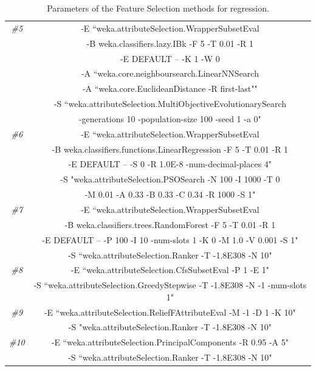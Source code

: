 \documentclass[journal,twoside,web]{ieeecolor}
\begin{document}
\begin{table}[h!]
\begin{center}
{\begin{tabular}{cc}
			
			\textit{\#5} &  -E 
			 ``weka.attributeSelection.WrapperSubsetEval \\
			& -B weka.classifiers.lazy.IBk -F 5 -T 0.01 -R 1 \\
			& -E DEFAULT -- -K 1 -W 0 \\
			& -A ``weka.core.neighboursearch.LinearNNSearch \\
			& -A ``weka.core.EuclideanDistance -R first-last""  \\
			& -S ``weka.attributeSelection.MultiObjectiveEvolutionarySearch \\
			 & -generations 10 -population-size 100 -seed 1 -a 0" \\
			
			
			\textit{\#6} & -E ``weka.attributeSelection.WrapperSubsetEval \\
			& -B weka.classifiers.functions.LinearRegression -F 5 -T 0.01 -R 1 \\
			& -E DEFAULT -- -S 0 -R 1.0E-8 -num-decimal-places 4" \\
			& -S "weka.attributeSelection.PSOSearch -N 100 -I 1000 -T 0 \\
			& -M 0.01 -A 0.33 -B 0.33 -C 0.34 -R 1000 -S 1"\\
			
			
			\textit{\#7} & -E ``weka.attributeSelection.WrapperSubsetEval \\
			& -B weka.classifiers.trees.RandomForest -F 5 -T 0.01 -R 1 \\
			& -E DEFAULT -- -P 100 -I 10 -num-slots 1 -K 0 -M 1.0 -V 0.001 -S 1" \\
			& -S ``weka.attributeSelection.Ranker -T -1.8E308 -N 10"\\
			\textit{\#8} & -E ``weka.attributeSelection.CfsSubsetEval -P 1 -E 1" \\
			& -S ``weka.attributeSelection.GreedyStepwise -T -1.8E308 -N -1 -num-slots 1"\\
			\textit{\#9} & -E ``weka.attributeSelection.ReliefFAttributeEval -M -1 -D 1 -K 10" \\
			& -S "weka.attributeSelection.Ranker -T -1.8E308 -N 10"\\
			\textit{\#10} & -E ``weka.attributeSelection.PrincipalComponents -R 0.95 -A 5"\\
			& -S ``weka.attributeSelection.Ranker -T -1.8E308 -N 10"\\
			
			\hline		
		\end{tabular}}
	\end{center}
	\caption{Parameters of the Feature Selection methods for regression.}
	\label{PFSM}
\end{table}
\end{document}
